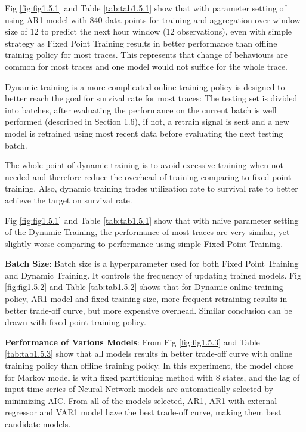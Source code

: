 \documentclass{article}
\begin{document}
\begin{flushleft}
Fig \ref{fig:fig1.5.1} and Table \ref{tab:tab1.5.1} show that with parameter setting of using AR1 model with 840 data points for training and aggregation over window size of 12 to predict the next hour window (12 observations), even with simple strategy as Fixed Point Training results in better performance than offline training policy for most traces. This represents that change of behaviours are common for most traces and one model would not suffice for the whole trace.
\end{flushleft}

\begin{flushleft}
Dynamic training is a more complicated online training policy is designed to better reach the goal for survival rate for most traces: The testing set is divided into batches, after evaluating the performance on the current batch is well performed (described in Section 1.6), if not, a retrain signal is sent and a new model is retrained using most recent data before evaluating the next testing batch. 

The whole point of dynamic training is to avoid excessive training when not needed and therefore reduce the overhead of training comparing to fixed point training. Also, dynamic training trades utilization rate to survival rate to better achieve the target on survival rate.

Fig \ref{fig:fig1.5.1} and Table \ref{tab:tab1.5.1} show that with naive parameter setting of the Dynamic Training, the performance of most traces are very similar, yet slightly worse comparing to performance using simple Fixed Point Training.
\end{flushleft}

\begin{flushleft}
\textbf{Batch Size}: Batch size is a hyperparameter used for both Fixed Point Training and Dynamic Training. It controls the frequency of updating trained models. Fig \ref{fig:fig1.5.2} and Table \ref{tab:tab1.5.2} shows that for Dynamic online training policy, AR1 model and fixed training size, more frequent retraining results in better trade-off curve, but more expensive overhead. Similar conclusion can be drawn with fixed point training policy.
\end{flushleft}

\begin{flushleft}
\textbf{Performance of Various Models}: From Fig \ref{fig:fig1.5.3} and Table \ref{tab:tab1.5.3} show that all models results in better trade-off curve with online training policy than offline training policy. In this experiment, the model chose for Markov model is with fixed partitioning method with $8$ states, and the lag of input time series of Neural Network models are automatically selected by minimizing AIC. From all of the models selected, AR1, AR1 with external regressor and VAR1 model have the best trade-off curve, making them best candidate models.
\end{flushleft}
\end{document}
